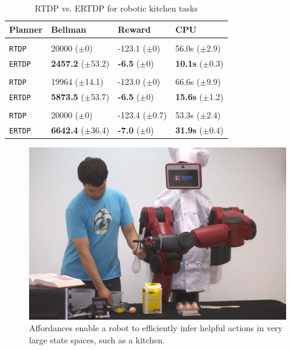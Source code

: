\documentclass[letterpaper]{article}
\newcommand{\ra}[1]{\renewcommand{\arraystretch}{#1}} %
\begin{document}
\begin{table}[t]
\ra{1.1}
\small
\begin{tabular}{@{}llll@{}}\toprule
Planner & Bellman & Reward & CPU \\ \midrule
&\hspace{-10mm}{\it Dry Ingredients} \\
\texttt{RTDP} 	& 20000 ($\pm$0) 			& {-123.1} ($\pm$0)  & {56.0s}   ($\pm$2.9) \\
\texttt{ERTDP} 	& {\bf 2457.2} ($\pm$53.2) 		& {\bf -6.5}   ($\pm$0) & {\bf 10.1s}   ($\pm$0.3) \\  \hline
&\hspace{-10mm}{\it Wet Ingredients} \\
\texttt{RTDP} 	& 19964 ($\pm$14.1) 			& { -123.0}   ($\pm$0) & 66.6s   ($\pm$9.9) \\
\texttt{ERTDP} 	& {\bf 5873.5} ($\pm$53.7) 		& {\bf -6.5}   ($\pm$0) & {\bf 15.6s}   ($\pm$1.2) \\ \hline
&\hspace{-10mm}{\it Brownie Batter} \\
\texttt{RTDP} 	& 20000 ($\pm$0) 			& -123.4   ($\pm$0.7) & { 53.3s}   ($\pm$2.4) \\
\texttt{ERTDP} 	& {\bf 6642.4} ($\pm$36.4) 		& {\bf -7.0}   ($\pm$0) & {\bf 31.9s}   ($\pm$0.4) \\ 
\bottomrule
\end{tabular}
\caption{RTDP vs. ERTDP for robotic kitchen tasks}
\label{table:baxter_results}
\end{table}




\begin{figure}[b]
\centering
\includegraphics[width=0.75\linewidth]{figures/baxter.jpg}%
  \caption{Affordances enable a robot to efficiently infer helpful actions in
    very large state spaces, such as a kitchen.}
  \label{fig:baxter_results}
\end{figure}
\end{document}
